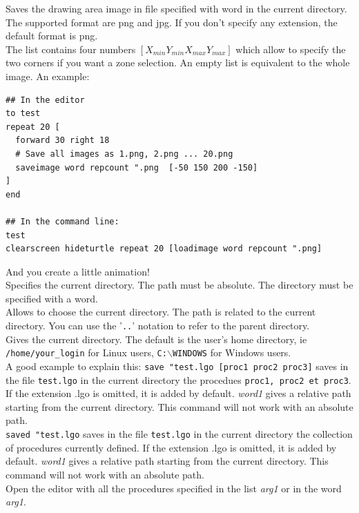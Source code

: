 Saves the drawing area image in file specified with word in the current directory.\\
The supported format are png and jpg. If you don't specify any extension, the default format is png.\\
The list contains four numbers $[X_{min} Y_{min} X_{max} Y_{max}]$ which allow to specify the two corners if you want a zone selection. An empty list is equivalent to the whole image. An example:
\begin{verbatim}
## In the editor
to test
repeat 20 [
  forward 30 right 18
  # Save all images as 1.png, 2.png ... 20.png
  saveimage word repcount ".png  [-50 150 200 -150]
]
end 

## In the command line:
test
clearscreen hideturtle repeat 20 [loadimage word repcount ".png] 
\end{verbatim}
And you create a little animation!\\
Specifies the current directory.  The path must be absolute.  The directory must be specified with a word.\\
Allows to choose the current directory. The path is related to the current directory. You can use the '\texttt{..}' notation to refer to the parent directory.\\
 Gives the current directory.  The default is the user's home directory, ie \texttt{/home/your\_login} for Linux users, \texttt{C:$\backslash$WINDOWS} for Windows users.\\
A good example to explain this:
\texttt{save "test.lgo [proc1 proc2 proc3]} saves in the file \texttt{test.lgo} in the current directory the procedues \texttt{proc1, proc2 et proc3}. If the extension .lgo is omitted, it is added by default. \textit{word1} gives a relative path starting from the current directory.  This command will not work with an absolute path.\\
\texttt{saved "test.lgo} saves in the file \texttt{test.lgo} in the current directory the collection of procedures currently defined.  If the extension .lgo is omitted, it is added by default. \textit{word1} gives a relative path starting from the current directory.  This command will not work with an absolute path.\\
Open the editor with all the procedures specified in the list \textit{arg1} or in the word \textit{arg1}.\\
